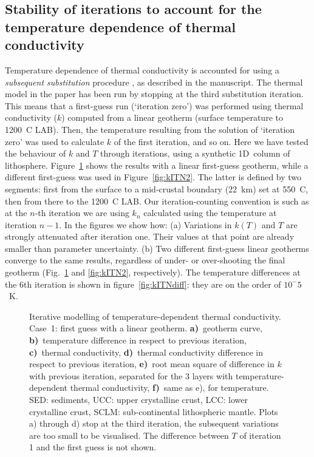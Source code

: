 {\begin{subappendices}
\subsection{Stability of iterations to account for the temperature dependence of thermal conductivity}
\label{ss:ApplSup:MethodTests:ItStab}

Temperature dependence of thermal conductivity is accounted for using a \textit{subsequent substitution} procedure \parencite[``Picard's method'', see e.g. ][]{Hauck1999}, as described in the manuscript.
The thermal model in the paper has been run by stopping at the third substitution iteration.
This means that a first-guess run (`iteration zero') was performed using thermal conductivity ($k$) computed from a linear geotherm (surface temperature to 1200~\textdegree C LAB).
Then, the temperature resulting from the solution of `iteration zero' was used to calculate $k$ of the first iteration, and so on.
Here we have tested the behaviour of $k$ and $T$ through iterations, using a synthetic 1D~column of lithosphere.
Figure~\ref{fig:kITN1} shows the results with a linear first-guess geotherm, while a different first-guess was used in Figure~\ref{fig:kITN2}.
The latter is defined by two segments: first from the surface to a mid-crustal boundary (22~km) set at 550~\textdegree C, then from there to the 1200~\textdegree C LAB.
Our iteration-counting convention is such as at the $n$-th iteration we are using $k_n$ calculated using the temperature at iteration $n-1$.
In the figures we show how:
(a) Variations in $k(T)$ and $T$ are strongly attenuated after iteration one. Their values at that point are already smaller than parameter uncertainty.
(b) Two different first-guess linear geotherms converge to the same results, regardless of under- or over-shooting the final geotherm (Fig.~\ref{fig:kITN1} and \ref{fig:kITN2}, respectively). The temperature differences at the 6th iteration is shown in figure~\ref{fig:kITNdiff}: they are on the order of $10^-5$~K.

\begin{figure}
	\begin{adjustbox}{center}
	\end{adjustbox}
	\caption{Iterative modelling of temperature-dependent thermal conductivity. Case~1: first guess with a linear geotherm. \textbf{a)}~geotherm curve, \textbf{b)}~temperature difference in respect to previous iteration, \textbf{c)}~thermal conductivity, \textbf{d)}~thermal conductivity difference in respect to previous iteration, \textbf{e)}~root mean square of difference in $k$ with previous iteration, separated for the 3 layers with temperature-dependent thermal conductivity, \textbf{f)}~same as e), for temperature. SED: sediments, UCC: upper crystalline crust, LCC: lower crystalline crust, SCLM: sub-continental lithospheric mantle.
	Plots a) through d) stop at the third iteration, the subsequent variations are too small to be visualised. The difference between $T$ of iteration 1 and the first guess is not shown.}
	\label{fig:kITN1}
\end{figure}


\end{subappendices}}
